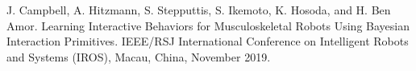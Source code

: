 \documentclass[letterpaper, 10 pt, conference]{ieeeconf}  %
\begin{document}
\addtolength{\textheight}{-12cm}   %








\begin{thebibliography}{99}
 J. Campbell, A. Hitzmann, S. Stepputtis, S. Ikemoto, K. Hosoda, and H. Ben Amor. Learning Interactive Behaviors for Musculoskeletal Robots Using Bayesian Interaction Primitives. IEEE/RSJ International Conference on Intelligent Robots and Systems (IROS), Macau, China, November 2019.
\end{thebibliography}
\end{document}

